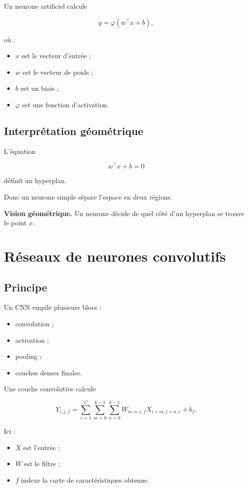 ﻿\documentclass[11pt,a4paper]{article}
\begin{document}
Un neurone artificiel calcule

\[
y = \varphi(w^\top x + b),
\]

où :
\begin{itemize}
    \item $x$ est le vecteur d’entrée ;
    \item $w$ est le vecteur de poids ;
    \item $b$ est un biais ;
    \item $\varphi$ est une fonction d’activation.
\end{itemize}

\subsection{Interprétation géométrique}

L’équation

\[
w^\top x + b = 0
\]

définit un hyperplan.

Donc un neurone simple sépare l’espace en deux régions.

\textbf{Vision géométrique.}  
Un neurone décide de quel côté d’un hyperplan se trouve le point $x$.

\section{Réseaux de neurones convolutifs}

\subsection{Principe}

Un CNN empile plusieurs blocs :
\begin{itemize}
    \item convolution ;
    \item activation ;
    \item pooling ;
    \item couches denses finales.
\end{itemize}

Une couche convolutive calcule

\[
Y_{i,j,f}
=
\sum_{c=1}^{C}
\sum_{m=0}^{k-1}
\sum_{n=0}^{k-1}
W_{m,n,c,f}X_{i+m,j+n,c} + b_f.
\]

Ici :
\begin{itemize}
    \item $X$ est l’entrée ;
    \item $W$ est le filtre ;
    \item $f$ indexe la carte de caractéristiques obtenue.
\end{itemize}
\end{document}
